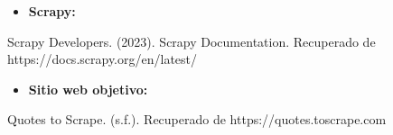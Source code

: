 \documentclass[
  letterpaper,
  DIV=11,
  numbers=noendperiod]{scrartcl}
\providecommand{\tightlist}{%
  \setlength{\itemsep}{0pt}\setlength{\parskip}{0pt}}\usepackage{longtable,booktabs,array}
\begin{document}
\begin{itemize}
\tightlist
\item
  \textbf{Scrapy:}
\end{itemize}

Scrapy Developers. (2023). Scrapy Documentation. Recuperado de
https://docs.scrapy.org/en/latest/

\begin{itemize}
\tightlist
\item
  \textbf{Sitio web objetivo:}
\end{itemize}

Quotes to Scrape. (s.f.). Recuperado de https://quotes.toscrape.com
\end{document}
